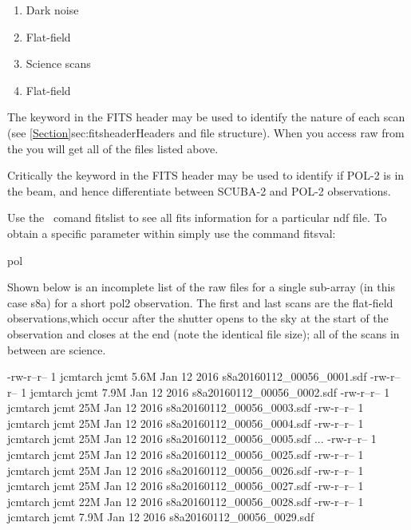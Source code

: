 \begin{enumerate}\itemsep-0.2em
\item Dark noise
\item Flat-field
\item Science scans
\item Flat-field
\end{enumerate}

The  keyword in the FITS header may be used to identify the nature of each scan (see
\cref{Section}{sec:fitsheader}{Headers and file structure}).  When you
access raw from the  you
will get all of the files listed above. 


Critically the  keyword in the FITS header may be used to
identify if POL-2 is in the beam, and hence differentiate between SCUBA-2 
and POL-2 observations.


\begin{tip}
Use the  \Kappa\ comand fitslist to see all fits information for a particular ndf file. 
To obtain a specific parameter within simply use the command fitsval:
\begin{terminalv}
pol
\end{terminalv}
\end{tip}

Shown below is an incomplete list of the raw files for a single sub-array (in this
case s8a) for a short pol2 observation. The first and last
scans are the flat-field observations,which occur after the shutter
opens to the sky at the start of the observation and closes at the end
(note the identical file size); all of the scans in between are
science.


\begin{terminalv}
\end{terminalv}

\begin{terminalv}
-rw-r--r-- 1 jcmtarch jcmt 5.6M Jan 12  2016 s8a20160112_00056_0001.sdf
-rw-r--r-- 1 jcmtarch jcmt 7.9M Jan 12  2016 s8a20160112_00056_0002.sdf
-rw-r--r-- 1 jcmtarch jcmt  25M Jan 12  2016 s8a20160112_00056_0003.sdf
-rw-r--r-- 1 jcmtarch jcmt  25M Jan 12  2016 s8a20160112_00056_0004.sdf
-rw-r--r-- 1 jcmtarch jcmt  25M Jan 12  2016 s8a20160112_00056_0005.sdf
...
-rw-r--r-- 1 jcmtarch jcmt  25M Jan 12  2016 s8a20160112_00056_0025.sdf
-rw-r--r-- 1 jcmtarch jcmt  25M Jan 12  2016 s8a20160112_00056_0026.sdf
-rw-r--r-- 1 jcmtarch jcmt  25M Jan 12  2016 s8a20160112_00056_0027.sdf
-rw-r--r-- 1 jcmtarch jcmt  22M Jan 12  2016 s8a20160112_00056_0028.sdf
-rw-r--r-- 1 jcmtarch jcmt 7.9M Jan 12  2016 s8a20160112_00056_0029.sdf
\end{terminalv}

